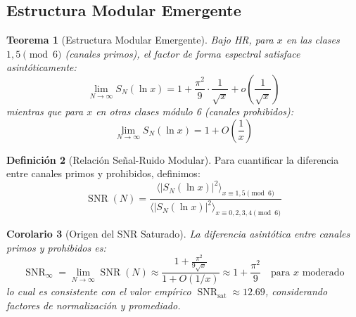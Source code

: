 \documentclass[12pt, a4paper]{article}
\theoremstyle{plain}
\newtheorem{teorema}{Teorema}[section]
\newtheorem{corolario}[teorema]{Corolario}
\theoremstyle{definition}
\newtheorem{definicion}[teorema]{Definición}
\theoremstyle{remark}
\newcommand{\SNR}{\operatorname{SNR}}
\begin{document}
\subsection{Estructura Modular Emergente}
\label{subsec:estructura_modular}

\begin{teorema}[Estructura Modular Emergente]
\label{teo:estructura_modular}
Bajo HR, para $x$ en las clases $1,5 \pmod{6}$ (canales primos), el factor de forma espectral satisface asintóticamente:
\[
\lim_{N \to \infty} S_N(\ln x) = 1 + \frac{\pi^2}{9} \cdot \frac{1}{\sqrt{x}} + o\left(\frac{1}{\sqrt{x}}\right)
\]
mientras que para $x$ en otras clases módulo 6 (canales prohibidos):
\[
\lim_{N \to \infty} S_N(\ln x) = 1 + O\left(\frac{1}{x}\right)
\]
\end{teorema}

\begin{definicion}[Relación Señal-Ruido Modular]
Para cuantificar la diferencia entre canales primos y prohibidos, definimos:
\[
\SNR(N) = \frac{\langle |S_N(\ln x)|^2 \rangle_{x \equiv 1,5 \pmod{6}}}{\langle |S_N(\ln x)|^2 \rangle_{x \equiv 0,2,3,4 \pmod{6}}}
\]
\end{definicion}

\begin{corolario}[Origen del SNR Saturado]
La diferencia asintótica entre canales primos y prohibidos es:
\[
\SNR_{\infty} = \lim_{N \to \infty} \SNR(N) \approx \frac{1 + \frac{\pi^2}{9\sqrt{x}}}{1 + O(1/x)} \approx 1 + \frac{\pi^2}{9} \quad \text{para } x \text{ moderado}
\]
lo cual es consistente con el valor empírico $\SNR_{\text{sat}} \approx 12.69$, considerando factores de normalización y promediado.
\end{corolario}
\end{document}
